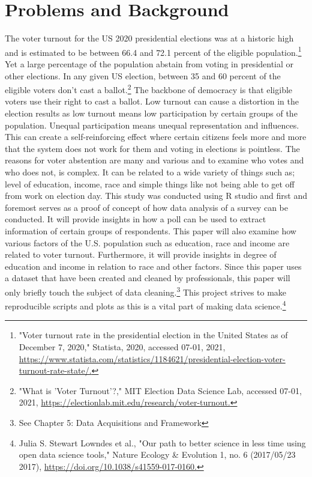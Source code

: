 \documentclass{article}
\begin{document}
\section{Problems and Background}
The voter turnout for the US 2020 presidential elections was at a historic high and is estimated to be between 66.4 and 72.1 percent of the eligible population.\footnote{"Voter turnout rate in the presidential election in the United States as of December 7, 2020," Statista, 2020, accessed 07-01, 2021, \url{https://www.statista.com/statistics/1184621/presidential-election-voter-turnout-rate-state/.}}  Yet a large percentage of the population abstain from voting in presidential or other elections. In any given US election, between 35 and 60 percent of the eligible voters don’t cast a ballot.\footnote{  "What is 'Voter Turnout'?," MIT Election Data Science Lab, accessed 07-01, 2021, \url{https://electionlab.mit.edu/research/voter-turnout.}}  The backbone of democracy is that eligible voters use their right to cast a ballot. Low turnout can cause a distortion in the election results as low turnout means low participation by certain groups of the population. Unequal participation means unequal representation and influences. This can create a self-reinforcing effect where certain citizens feels more and more that the system does not work for them and voting in elections is pointless.  The reasons for voter abstention are many and various and to examine who votes and who does not, is complex. It can be related to a wide variety of things such as; level of education, income, race and simple things like not being able to get off from work on election day. 
This study was conducted using R studio and first and foremost serves as a proof of concept of how data analysis of a survey can be conducted. It will provide insights in how a poll can be used to extract information of certain groups of respondents. This paper will also examine how various factors of the U.S. population such as education, race and income are related to voter turnout. Furthermore, it will provide insights in degree of education and income in relation to race and other factors. Since this paper uses a dataset that have been created and cleaned by professionals, this paper will only briefly touch the subject of data cleaning.\footnote{See Chapter 5: Data Acquisitions and Framework}    This project strives to make reproducible scripts and plots as this is a vital part of making data science.\footnote{  Julia S. Stewart Lowndes et al., "Our path to better science in less time using open data science tools," Nature Ecology & Evolution 1, no. 6 (2017/05/23 2017),
\url{https://doi.org/10.1038/s41559-017-0160.}}
\end{document}
